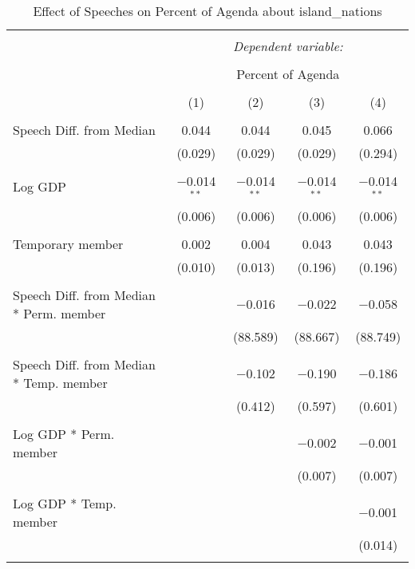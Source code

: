 
\begin{table}[!htbp] \centering 
  \caption{Effect of Speeches on Percent of Agenda about  island_nations} 
  \label{} 
\begin{tabular}{@{\extracolsep{5pt}}lcccc} 
\\[-1.8ex]\hline 
\hline \\[-1.8ex] 
 & \multicolumn{4}{c}{\textit{Dependent variable:}} \\ 
\cline{2-5} 
\\[-1.8ex] & \multicolumn{4}{c}{Percent of Agenda} \\ 
\\[-1.8ex] & (1) & (2) & (3) & (4)\\ 
\hline \\[-1.8ex] 
 Speech Diff. from Median & 0.044 & 0.044 & 0.045 & 0.066 \\ 
  & (0.029) & (0.029) & (0.029) & (0.294) \\ 
  & & & & \\ 
 Log GDP & $-$0.014$^{**}$ & $-$0.014$^{**}$ & $-$0.014$^{**}$ & $-$0.014$^{**}$ \\ 
  & (0.006) & (0.006) & (0.006) & (0.006) \\ 
  & & & & \\ 
 Temporary member & 0.002 & 0.004 & 0.043 & 0.043 \\ 
  & (0.010) & (0.013) & (0.196) & (0.196) \\ 
  & & & & \\ 
 Speech Diff. from Median * Perm. member &  & $-$0.016 & $-$0.022 & $-$0.058 \\ 
  &  & (88.589) & (88.667) & (88.749) \\ 
  & & & & \\ 
 Speech Diff. from Median * Temp. member &  & $-$0.102 & $-$0.190 & $-$0.186 \\ 
  &  & (0.412) & (0.597) & (0.601) \\ 
  & & & & \\ 
 Log GDP * Perm. member &  &  & $-$0.002 & $-$0.001 \\ 
  &  &  & (0.007) & (0.007) \\ 
  & & & & \\ 
 Log GDP * Temp. member &  &  &  & $-$0.001 \\ 
  &  &  &  & (0.014) \\ 
  & & & & \\ 

\end{tabular}
\end{table}
